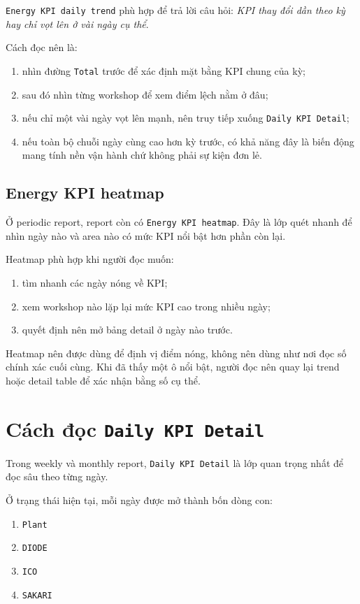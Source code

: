 \texttt{Energy KPI daily trend} phù hợp để trả lời câu hỏi: \textit{KPI thay đổi dần theo kỳ hay chỉ vọt lên ở vài ngày cụ thể}.

Cách đọc nên là:

\begin{enumerate}[label=-]
\item nhìn đường \texttt{Total} trước để xác định mặt bằng KPI chung của kỳ;
\item sau đó nhìn từng workshop để xem điểm lệch nằm ở đâu;
\item nếu chỉ một vài ngày vọt lên mạnh, nên truy tiếp xuống \texttt{Daily KPI Detail};
\item nếu toàn bộ chuỗi ngày cùng cao hơn kỳ trước, có khả năng đây là biến động mang tính nền vận hành chứ không phải sự kiện đơn lẻ.
\end{enumerate}

\subsection{Energy KPI heatmap}

Ở periodic report, report còn có \texttt{Energy KPI heatmap}. Đây là lớp quét nhanh để nhìn ngày nào và area nào có mức KPI nổi bật hơn phần còn lại.

Heatmap phù hợp khi người đọc muốn:

\begin{enumerate}[label=-]
\item tìm nhanh các ngày nóng về KPI;
\item xem workshop nào lặp lại mức KPI cao trong nhiều ngày;
\item quyết định nên mở bảng detail ở ngày nào trước.
\end{enumerate}

Heatmap nên được dùng để định vị điểm nóng, không nên dùng như nơi đọc số chính xác cuối cùng. Khi đã thấy một ô nổi bật, người đọc nên quay lại trend hoặc detail table để xác nhận bằng số cụ thể.

\section{Cách đọc \texttt{Daily KPI Detail}}

Trong weekly và monthly report, \texttt{Daily KPI Detail} là lớp quan trọng nhất để đọc sâu theo từng ngày.

Ở trạng thái hiện tại, mỗi ngày được mở thành bốn dòng con:

\begin{enumerate}[label=-]
\item \texttt{Plant}
\item \texttt{DIODE}
\item \texttt{ICO}
\item \texttt{SAKARI}
\end{enumerate}

